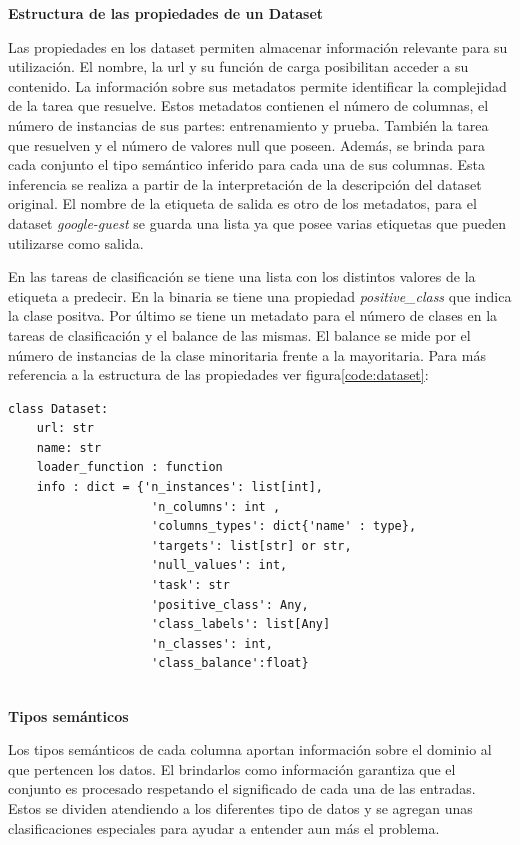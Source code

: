 \begin{flushleft} 
    { \textbf{Estructura de las propiedades de un Dataset}}\label{class:dataset_pro}
\end{flushleft}
Las propiedades en los dataset permiten almacenar información relevante para su utilización. El nombre, la url y su función de carga posibilitan acceder a su contenido.
La información sobre sus metadatos permite identificar la complejidad de la tarea que resuelve.
Estos metadatos contienen el número de columnas, el número de instancias de sus partes: entrenamiento y prueba. También la tarea que resuelven y el número de 
valores null que poseen. Además, se brinda para cada conjunto el tipo semántico inferido para cada una de sus columnas. Esta inferencia se realiza a partir de la 
interpretación de la descripción del dataset original. El nombre de la etiqueta de salida es otro de los metadatos, para el dataset \textit{google-guest} se guarda una 
lista ya que posee varias etiquetas que pueden utilizarse como salida. 

En las tareas de clasificación se tiene una lista con los distintos valores de la etiqueta a predecir. En la binaria se tiene una propiedad \textit{positive\_class} 
que indica la clase positva. Por último se tiene un metadato para el número de clases en la tareas de clasificación y el balance de las mismas. 
El balance se mide por el número de instancias de la clase minoritaria frente a la mayoritaria. 
Para más referencia a la estructura de las propiedades ver figura\ref{code:dataset}:      

\begin{lstlisting}[caption= Clase Dataset, label = code:dataset]
class Dataset:
    url: str
    name: str
    loader_function : function
    info : dict = {'n_instances': list[int],
                    'n_columns': int , 
                    'columns_types': dict{'name' : type},
                    'targets': list[str] or str,
                    'null_values': int,
                    'task': str 
                    'positive_class': Any,
                    'class_labels': list[Any] 
                    'n_classes': int, 
                    'class_balance':float}
  
\end{lstlisting}

\begin{flushleft} 
    { \textbf{Tipos semánticos}}\label{class:semantic_types}
\end{flushleft}
Los tipos semánticos de cada columna aportan información sobre el dominio al que pertencen los datos. El brindarlos como información garantiza que el conjunto 
es procesado respetando el significado de cada una de las entradas. Estos se dividen atendiendo a los diferentes tipo de datos y 
se agregan unas clasificaciones especiales para ayudar a entender aun más el problema.

